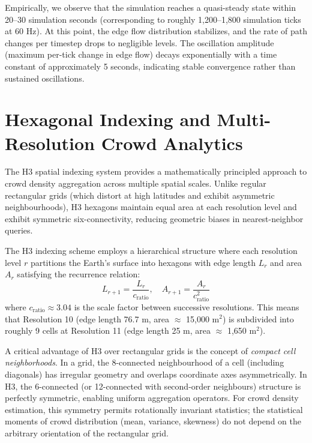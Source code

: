 \documentclass[12pt,a4paper,oneside]{report}
\begin{document}
Empirically, we observe that the simulation reaches a quasi-steady state within 20--30 simulation seconds (corresponding to roughly 1,200--1,800 simulation ticks at 60 Hz). At this point, the edge flow distribution stabilizes, and the rate of path changes per timestep drops to negligible levels. The oscillation amplitude (maximum per-tick change in edge flow) decays exponentially with a time constant of approximately 5 seconds, indicating stable convergence rather than sustained oscillations.

\section{Hexagonal Indexing and Multi-Resolution Crowd Analytics}
The H3 spatial indexing system provides a mathematically principled approach to crowd density aggregation across multiple spatial scales. Unlike regular rectangular grids (which distort at high latitudes and exhibit asymmetric neighbourhoods), H3 hexagons maintain equal area at each resolution level and exhibit symmetric six-connectivity, reducing geometric biases in nearest-neighbor queries.

The H3 indexing scheme employs a hierarchical structure where each resolution level $r$ partitions the Earth's surface into hexagons with edge length $L_r$ and area $A_r$ satisfying the recurrence relation:
\begin{equation}
L_{r+1} = \frac{L_r}{c_{\text{ratio}}}, \quad A_{r+1} = \frac{A_r}{c_{\text{ratio}}^2}
\label{eq:h3_scaling}
\end{equation}
where $c_{\text{ratio}} \approx 3.04$ is the scale factor between successive resolutions. This means that Resolution 10 (edge length 76.7 m, area $\approx$ 15,000 m$^2$) is subdivided into roughly 9 cells at Resolution 11 (edge length 25 m, area $\approx$ 1,650 m$^2$).

A critical advantage of H3 over rectangular grids is the concept of \textit{compact cell neighborhoods}. In a grid, the 8-connected neighbourhood of a cell (including diagonals) has irregular geometry and overlaps coordinate axes asymmetrically. In H3, the 6-connected (or 12-connected with second-order neighbours) structure is perfectly symmetric, enabling uniform aggregation operators. For crowd density estimation, this symmetry permits rotationally invariant statistics; the statistical moments of crowd distribution (mean, variance, skewness) do not depend on the arbitrary orientation of the rectangular grid.
\end{document}

